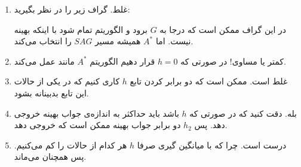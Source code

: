 \begin{enumerate}
    \item غلط. گراف زیر را در نظر بگیرید:
    \begin{center}
    \end{center}
    در این گراف ممکن است که  درجا به $G$ برود و الگوریتم تمام شود با اینکه بهینه نیست.
    اما $A^*$ همیشه مسیر $SAG$ را انتخاب می‌کند.
    \item کمتر یا مساوی! در صورتی که $h = 0$ قرار دهیم الگوریتم $A^*$ مانند  عمل می‌کند.
    \item غلط است. ممکن است که دو برابر کردن تابع $h$ کاری کنیم که در یکی از حالات این تابع بدبینانه بشود.
    \item بله. دقت کنید که در صورتی که $h$  باشد باید حداکثر به اندازه‌ی جواب بهینه خروجی دهد. پس $h_2$ دو برابر جواب بهینه ممکن است که خروجی دهد.
    \item درست است. چرا که با میانگین گیری صرفا $h$ هر کدام از حالات را کم می‌کنیم. پس همچنان
    می‌ماند.
\end{enumerate}